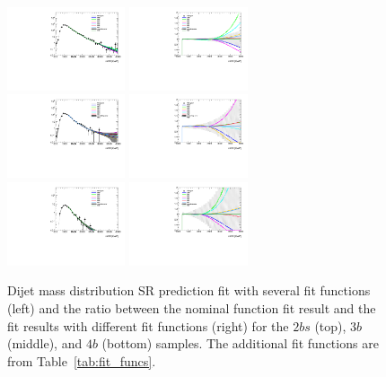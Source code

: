 \begin{figure}[htb!]
\begin{center}
\includegraphics[width=0.31\textwidth,angle=-90]{figures/boosted/Syst_Smooth/smoothFuncCompare_22_comp.pdf}
\includegraphics[width=0.31\textwidth,angle=-90]{figures/boosted/Syst_Smooth/smoothFuncCompare_22_comp_ratio.pdf} \\
\includegraphics[width=0.31\textwidth,angle=-90]{figures/boosted/Syst_Smooth/smoothFuncCompare_33_comp.pdf}
\includegraphics[width=0.31\textwidth,angle=-90]{figures/boosted/Syst_Smooth/smoothFuncCompare_33_comp_ratio.pdf} \\
\includegraphics[width=0.31\textwidth,angle=-90]{figures/boosted/Syst_Smooth/smoothFuncCompare_44_comp.pdf}
\includegraphics[width=0.31\textwidth,angle=-90]{figures/boosted/Syst_Smooth/smoothFuncCompare_44_comp_ratio.pdf} \\
\caption{ Dijet mass distribution SR prediction fit with several fit functions (left) and the ratio between the nominal function fit result and the fit results with different fit functions (right)  for the $2bs$ (top), $3b$ (middle), and $4b$ (bottom) samples. The additional fit functions are from Table~\ref{tab:fit_funcs}.}
\label{fig:qcd_fit_funcs_sys}
\end{center}
\end{figure}